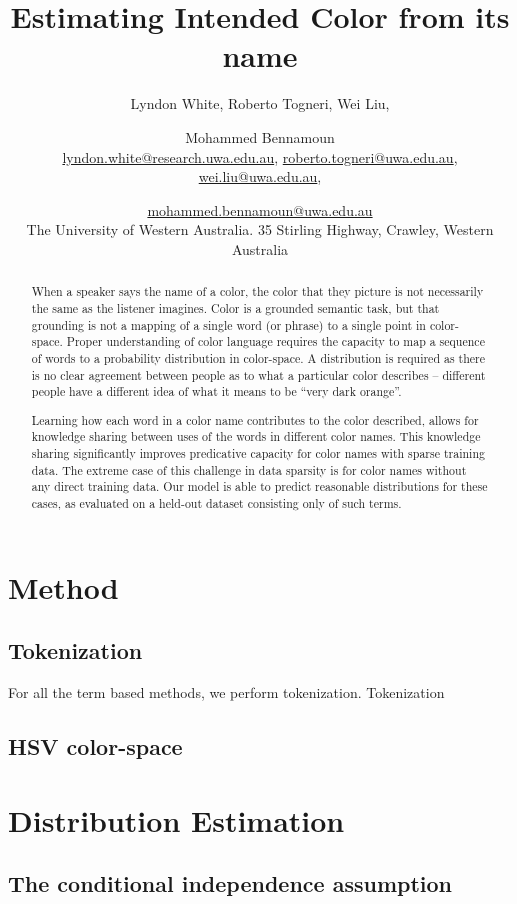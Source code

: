 \documentclass[11pt,a4paper]{article}
\title{Estimating Intended Color from its name}
\author{Lyndon White, %
	Roberto Togneri, %
	Wei Liu, %
	\and Mohammed Bennamoun%
	\\ 
	\url{lyndon.white@research.uwa.edu.au}, %
	\url{roberto.togneri@uwa.edu.au},\\
	\url{wei.liu@uwa.edu.au}, %
	\and \url{mohammed.bennamoun@uwa.edu.au}%
	\\
	The University of Western Australia.
	35 Stirling Highway, Crawley, Western Australia
}
\begin{document}
\maketitle

\begin{abstract}
When a speaker says the name of a color, the color that they picture is not necessarily the same as the listener imagines.
Color is a grounded semantic task, but that grounding is not a mapping of a single word (or phrase) to a single point in color-space.
Proper understanding of color language requires the capacity to map a sequence of words to a probability distribution in color-space.
A distribution is required as there is no clear agreement between people as to what a particular color describes -- different people have a different idea of what it means to be ``very dark orange''.

Learning how each word in a color name contributes to the color described,
allows for knowledge sharing between uses of the words in different color names.
This knowledge sharing significantly improves predicative capacity for color names with sparse training data.
The extreme case of this challenge in data sparsity is for color names without any direct training data.
Our model is able to predict reasonable distributions for these cases, as evaluated on a held-out dataset consisting only of such terms.
\end{abstract}








\section{Method}
\subsection{Tokenization}
For all the term based methods, we perform tokenization.
Tokenization 

\subsection{HSV color-space}

\section{Distribution Estimation}
\subsection{The conditional independence assumption}\label{sec:conditional-independence-assumption}
\end{document}
